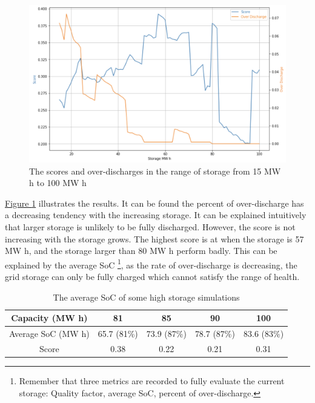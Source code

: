 \documentclass[12pt,a4paper]{report}
\begin{document}
            \begin{figure}[ht]
                \centerline{\includegraphics[scale=0.85]{simu_score}}
                \caption{The scores and over-discharges in the range of storage from 15 MW h to 100 MW h}
                \label{fig_simu_score}
            \end{figure}

            \hyperref[fig_simu_score]{Figure \ref*{fig_simu_score}} illustrates the results. It can be found the percent of over-discharge has a decreasing tendency with the increasing storage. It can be explained intuitively that larger storage is unlikely to be fully discharged. However, the score is not increasing with the storage grows. The highest score is at when the storage is 57 MW h, and the storage larger than 80 MW h perform badly. This can be explained by the average SoC \footnote{Remember that three metrics are recorded to fully evaluate the current storage: Quality factor, average SoC, percent of over-discharge.}, as the rate of over-discharge is decreasing, the grid storage can only be fully charged which cannot satisfy the range of health. 

            \begin{table}[ht]
                \centering
                \begin{tabulary}{\linewidth}{C C C C C}
                    \hline
                    Capacity (MW h) & 81 & 85 & 90 & 100 \\ \hline
                    Average SoC (MW h) & 65.7 (81\%) & 73.9 (87\%) & 78.7 (87\%) & 83.6 (83\%) \\ \hline
                    Score & 0.38 & 0.22 & 0.21 & 0.31 \\
                    \hline
                \end{tabulary}
                \caption{The average SoC of some high storage simulations}
                \label{table_high_storage}
            \end{table}
\end{document}
